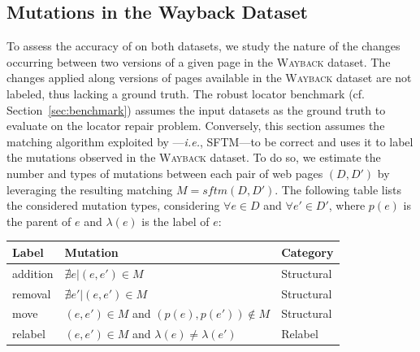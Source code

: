 \documentclass[preprint, 12pt]{elsarticle}
\begin{document}
\subsection{Mutations in the {\sc Wayback} Dataset}
To assess the accuracy of \erratum on both datasets, we study the nature of the changes occurring between two versions of a given page in the \textsc{Wayback} dataset.
The changes applied along versions of pages available in the \textsc{Wayback} dataset are not labeled, thus lacking a ground truth.
% 
The robust locator benchmark (cf. Section~\ref{sec:benchmark}) assumes the input datasets as the ground truth to evaluate \erratum on the locator repair problem.
Conversely, this section assumes the matching algorithm exploited by \erratum---\emph{i.e.}, SFTM---to be correct and uses it to label the mutations observed in the \textsc{Wayback} dataset.
% 
To do so, we estimate the number and types of mutations between each pair of web pages $(D, D')$ by leveraging the resulting matching $M = sftm(D,D')$.
The following table lists the considered mutation types, considering $\forall e \in D$ and $\forall e' \in D'$, where $p(e)$ is the parent of $e$ and $\lambda(e)$ is the label of $e$:
\begin{table}[h]
\centering
\begin{tabular}{|l|l|l|}
\hline
Label        & Mutation                                          & Category \\ \hline
\hline
\sf addition & $\nexists e | (e, e') \in M$                      & Structural \\ \hline
\sf removal  & $\nexists e' | (e, e') \in M$                     & Structural \\ \hline
\sf move     & $(e, e') \in M$ and $(p(e), p(e')) \notin M$      & Structural \\ \hline
\sf relabel  & $(e, e') \in M$ and $\lambda(e) \neq \lambda(e')$ & Relabel \\ \hline
\end{tabular}
\end{table}
\end{document}
